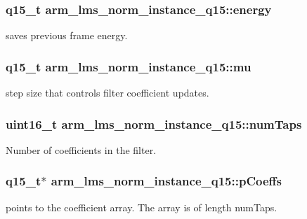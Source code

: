 \subsubsection[{\texorpdfstring{energy}{energy}}]{\setlength{\rightskip}{0pt plus 5cm}q15\+\_\+t arm\+\_\+lms\+\_\+norm\+\_\+instance\+\_\+q15\+::energy}\hypertarget{structarm__lms__norm__instance__q15_a1c81ded399919d8181026bc1c8602e7b}{}\label{structarm__lms__norm__instance__q15_a1c81ded399919d8181026bc1c8602e7b}
saves previous frame energy. 
\subsubsection[{\texorpdfstring{mu}{mu}}]{\setlength{\rightskip}{0pt plus 5cm}q15\+\_\+t arm\+\_\+lms\+\_\+norm\+\_\+instance\+\_\+q15\+::mu}\hypertarget{structarm__lms__norm__instance__q15_a7ce00f21d11cfda6d963240641deea8c}{}\label{structarm__lms__norm__instance__q15_a7ce00f21d11cfda6d963240641deea8c}
step size that controls filter coefficient updates. 
\subsubsection[{\texorpdfstring{num\+Taps}{numTaps}}]{\setlength{\rightskip}{0pt plus 5cm}uint16\+\_\+t arm\+\_\+lms\+\_\+norm\+\_\+instance\+\_\+q15\+::num\+Taps}\hypertarget{structarm__lms__norm__instance__q15_a9ee7a45f4f315d7996a969e25fdc7146}{}\label{structarm__lms__norm__instance__q15_a9ee7a45f4f315d7996a969e25fdc7146}
Number of coefficients in the filter. 
\subsubsection[{\texorpdfstring{p\+Coeffs}{pCoeffs}}]{\setlength{\rightskip}{0pt plus 5cm}q15\+\_\+t$\ast$ arm\+\_\+lms\+\_\+norm\+\_\+instance\+\_\+q15\+::p\+Coeffs}\hypertarget{structarm__lms__norm__instance__q15_ae7bca648c75a2ffa02d87852bb78bc8a}{}\label{structarm__lms__norm__instance__q15_ae7bca648c75a2ffa02d87852bb78bc8a}
points to the coefficient array. The array is of length num\+Taps. 
